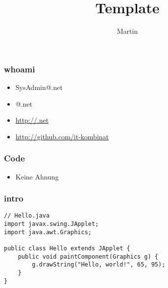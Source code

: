\documentclass[slidestop,compress,mathserif,12pt,xcolor=dvipsnames]{beamer}
\title{Template}
\author[Martin\hspace{2.5cm}{@it-kombinat.net}]    {Martin}
\institute{.net}
\begin{document}
\begin{frame}
\titlepage
\end{frame}

\begin{frame}
\frametitle{whoami}
  \begin{itemize}
  \item SysAdmin@.net
  \item @.net
  \item \url{http://.net}
  \item \url{http://github.com/it-kombinat}
  \end{itemize}
\end{frame}

\begin{frame}
\frametitle{Code}
 \begin{itemize}
 \item Keine Ahnung
 \end{itemize}
\end{frame}
\begin{frame}[fragile]
\frametitle{intro}
\begin{lstlisting}
// Hello.java
import javax.swing.JApplet;
import java.awt.Graphics;

public class Hello extends JApplet {
    public void paintComponent(Graphics g) {
        g.drawString("Hello, world!", 65, 95);
    }    
}
\end{lstlisting}
\end{frame}
\end{document}
